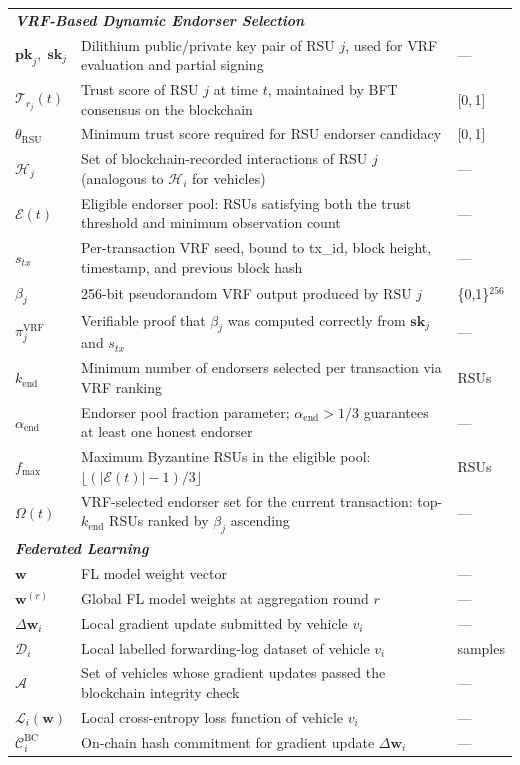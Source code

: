 \documentclass[12pt, a4paper]{report}
\begin{document}
\begin{longtable}{p{2.6cm} p{9.2cm} p{1.9cm}}
\multicolumn{3}{l}{\textit{\textbf{VRF-Based Dynamic Endorser Selection}}} \\[2pt]
$\mathbf{pk}_j,\;\mathbf{sk}_j$ & Dilithium public/private key pair of RSU $j$, used for VRF evaluation and partial signing & --- \\
$\mathcal{T}_{r_j}(t)$ & Trust score of RSU $j$ at time $t$, maintained by BFT consensus on the blockchain & [0,\,1] \\
$\theta_{\text{RSU}}$ & Minimum trust score required for RSU endorser candidacy & [0,\,1] \\
$\mathcal{H}_j$ & Set of blockchain-recorded interactions of RSU $j$ (analogous to $\mathcal{H}_i$ for vehicles) & --- \\
$\mathcal{E}(t)$ & Eligible endorser pool: RSUs satisfying both the trust threshold and minimum observation count & --- \\
$s_{tx}$ & Per-transaction VRF seed, bound to tx\_id, block height, timestamp, and previous block hash & --- \\
$\beta_j$ & 256-bit pseudorandom VRF output produced by RSU $j$ & \{0,1\}$^{256}$ \\
$\pi_j^{\text{VRF}}$ & Verifiable proof that $\beta_j$ was computed correctly from $\mathbf{sk}_j$ and $s_{tx}$ & --- \\
$k_{\text{end}}$ & Minimum number of endorsers selected per transaction via VRF ranking & RSUs \\
$\alpha_{\text{end}}$ & Endorser pool fraction parameter; $\alpha_{\text{end}} > 1/3$ guarantees at least one honest endorser & --- \\
$f_{\max}$ & Maximum Byzantine RSUs in the eligible pool: $\lfloor(|\mathcal{E}(t)|-1)/3\rfloor$ & RSUs \\
$\Omega(t)$ & VRF-selected endorser set for the current transaction: top-$k_{\text{end}}$ RSUs ranked by $\beta_j$ ascending & --- \\[6pt]

\multicolumn{3}{l}{\textit{\textbf{Federated Learning}}} \\[2pt]
$\mathbf{w}$ & FL model weight vector & --- \\
$\mathbf{w}^{(r)}$ & Global FL model weights at aggregation round $r$ & --- \\
$\Delta\mathbf{w}_i$ & Local gradient update submitted by vehicle $v_i$ & --- \\
$\mathcal{D}_i$ & Local labelled forwarding-log dataset of vehicle $v_i$ & samples \\
$\mathcal{A}$ & Set of vehicles whose gradient updates passed the blockchain integrity check & --- \\
$\mathcal{L}_i(\mathbf{w})$ & Local cross-entropy loss function of vehicle $v_i$ & --- \\
$\mathcal{C}_i^\mathrm{BC}$ & On-chain hash commitment for gradient update $\Delta\mathbf{w}_i$ & --- \\[6pt]


\end{longtable}
\end{document}
